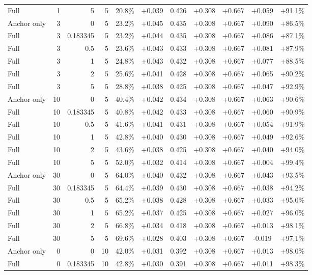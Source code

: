 \begin{table}[htbp]
\begin{tabular}{lrrrccccccc}
Full & 1 & 5 & 5 & 20.8\% & +0.039 & 0.426 & +0.308 & +0.667 & +0.059 & +91.1\% \\
Anchor only & 3 & 0 & 5 & 23.2\% & +0.045 & 0.435 & +0.308 & +0.667 & +0.090 & +86.5\% \\
Full & 3 & 0.183345 & 5 & 23.2\% & +0.044 & 0.435 & +0.308 & +0.667 & +0.086 & +87.1\% \\
Full & 3 & 0.5 & 5 & 23.6\% & +0.043 & 0.433 & +0.308 & +0.667 & +0.081 & +87.9\% \\
Full & 3 & 1 & 5 & 24.8\% & +0.043 & 0.432 & +0.308 & +0.667 & +0.077 & +88.5\% \\
Full & 3 & 2 & 5 & 25.6\% & +0.041 & 0.428 & +0.308 & +0.667 & +0.065 & +90.2\% \\
Full & 3 & 5 & 5 & 28.8\% & +0.038 & 0.425 & +0.308 & +0.667 & +0.047 & +92.9\% \\
Anchor only & 10 & 0 & 5 & 40.4\% & +0.042 & 0.434 & +0.308 & +0.667 & +0.063 & +90.6\% \\
Full & 10 & 0.183345 & 5 & 40.8\% & +0.042 & 0.433 & +0.308 & +0.667 & +0.060 & +90.9\% \\
Full & 10 & 0.5 & 5 & 41.6\% & +0.041 & 0.431 & +0.308 & +0.667 & +0.054 & +91.9\% \\
Full & 10 & 1 & 5 & 42.8\% & +0.040 & 0.430 & +0.308 & +0.667 & +0.049 & +92.6\% \\
Full & 10 & 2 & 5 & 43.6\% & +0.038 & 0.425 & +0.308 & +0.667 & +0.040 & +94.0\% \\
Full & 10 & 5 & 5 & 52.0\% & +0.032 & 0.414 & +0.308 & +0.667 & +0.004 & +99.4\% \\
Anchor only & 30 & 0 & 5 & 64.0\% & +0.040 & 0.432 & +0.308 & +0.667 & +0.043 & +93.5\% \\
Full & 30 & 0.183345 & 5 & 64.4\% & +0.039 & 0.430 & +0.308 & +0.667 & +0.038 & +94.2\% \\
Full & 30 & 0.5 & 5 & 65.2\% & +0.038 & 0.428 & +0.308 & +0.667 & +0.033 & +95.0\% \\
Full & 30 & 1 & 5 & 65.2\% & +0.037 & 0.425 & +0.308 & +0.667 & +0.027 & +96.0\% \\
Full & 30 & 2 & 5 & 66.8\% & +0.034 & 0.418 & +0.308 & +0.667 & +0.013 & +98.1\% \\
Full & 30 & 5 & 5 & 69.6\% & +0.028 & 0.403 & +0.308 & +0.667 & -0.019 & +97.1\% \\
Anchor only & 0 & 0 & 10 & 42.0\% & +0.031 & 0.392 & +0.308 & +0.667 & +0.013 & +98.0\% \\
Full & 0 & 0.183345 & 10 & 42.8\% & +0.030 & 0.391 & +0.308 & +0.667 & +0.011 & +98.3\% \\

\end{tabular}
\end{table}
